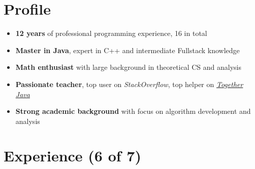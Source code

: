 \documentclass[letterpaper]{twentysecondcv} %
\begin{document}
\makesidebarFirst %

\section{Profile}

\begin{itemize}
	\item \textbf{12 years} of professional programming experience, 16 in total
	\item \textbf{Master in Java}, expert in C++ and intermediate Fullstack knowledge
	\item \textbf{Math enthusiast} with large background in theoretical CS and analysis
	\item \textbf{Passionate teacher}, top user on \textit{StackOverflow}, top helper on \textit{\href{https://togetherjava.org/}{Together Java}}
	\item \textbf{Strong academic background} with focus on algorithm development and analysis
\end{itemize}

\vspace{6mm}


\section{Experience (6 of 7)}
\end{document}
